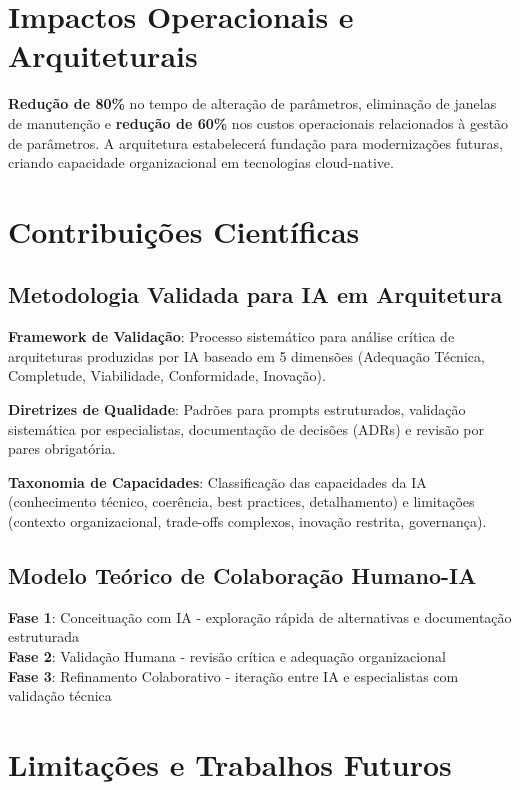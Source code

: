 \section{Impactos Operacionais e Arquiteturais}

\textbf{Redução de 80\%} no tempo de alteração de parâmetros, eliminação de janelas de manutenção e \textbf{redução de 60\%} nos custos operacionais relacionados à gestão de parâmetros. A arquitetura estabelecerá fundação para modernizações futuras, criando capacidade organizacional em tecnologias cloud-native.

\section{Contribuições Científicas}

\subsection{Metodologia Validada para IA em Arquitetura}

\textbf{Framework de Validação}: Processo sistemático para análise crítica de arquiteturas produzidas por IA baseado em 5 dimensões (Adequação Técnica, Completude, Viabilidade, Conformidade, Inovação).

\textbf{Diretrizes de Qualidade}: Padrões para prompts estruturados, validação sistemática por especialistas, documentação de decisões (ADRs) e revisão por pares obrigatória.

\textbf{Taxonomia de Capacidades}: Classificação das capacidades da IA (conhecimento técnico, coerência, best practices, detalhamento) e limitações (contexto organizacional, trade-offs complexos, inovação restrita, governança).

\subsection{Modelo Teórico de Colaboração Humano-IA}

\textbf{Fase 1}: Conceituação com IA - exploração rápida de alternativas e documentação estruturada \\
\textbf{Fase 2}: Validação Humana - revisão crítica e adequação organizacional \\
\textbf{Fase 3}: Refinamento Colaborativo - iteração entre IA e especialistas com validação técnica

\section{Limitações e Trabalhos Futuros}

